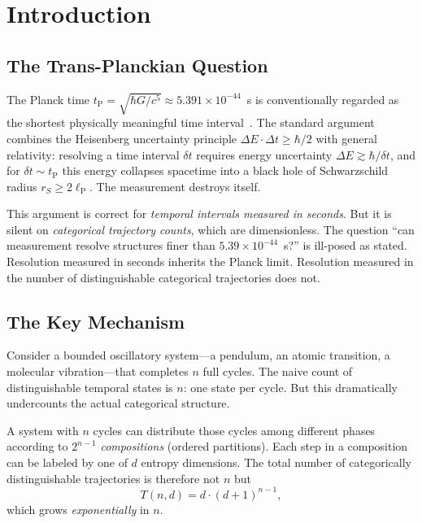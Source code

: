 \documentclass[twocolumn,10pt,a4paper]{article}
\theoremstyle{definition}
\theoremstyle{remark}
\newcommand{\tP}{t_{\mathrm{P}}}
\newcommand{\lP}{\ell_{\mathrm{P}}}
\begin{document}
\section{Introduction}
\label{sec:introduction}

\subsection{The Trans-Planckian Question}

The Planck time $\tP = \sqrt{\hbar G / c^5} \approx 5.391 \times 10^{-44}$~s is conventionally regarded as the shortest physically meaningful time interval~\cite{planck1901,garay1995}. The standard argument combines the Heisenberg uncertainty principle $\Delta E \cdot \Delta t \geq \hbar/2$ with general relativity: resolving a time interval $\delta t$ requires energy uncertainty $\Delta E \gtrsim \hbar / \delta t$, and for $\delta t \sim \tP$ this energy collapses spacetime into a black hole of Schwarzschild radius $r_S \geq 2\lP$. The measurement destroys itself.

This argument is correct for \emph{temporal intervals measured in seconds}. But it is silent on \emph{categorical trajectory counts}, which are dimensionless. The question ``can measurement resolve structures finer than $5.39 \times 10^{-44}$~s?'' is ill-posed as stated. Resolution measured in seconds inherits the Planck limit. Resolution measured in the number of distinguishable categorical trajectories does not.

\subsection{The Key Mechanism}

Consider a bounded oscillatory system---a pendulum, an atomic transition, a molecular vibration---that completes $n$ full cycles. The naive count of distinguishable temporal states is $n$: one state per cycle. But this dramatically undercounts the actual categorical structure.

A system with $n$ cycles can distribute those cycles among different phases according to $2^{n-1}$ \emph{compositions} (ordered partitions). Each step in a composition can be labeled by one of $d$ entropy dimensions. The total number of categorically distinguishable trajectories is therefore not $n$ but
\begin{equation}
\label{eq:main}
T(n,d) = d \cdot (d+1)^{n-1},
\end{equation}
which grows \emph{exponentially} in $n$.
\end{document}
